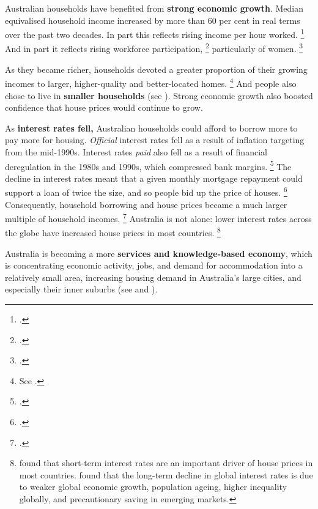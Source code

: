 Australian households have benefited from \textbf{strong economic growth}.
Median equivalised household income increased by more than 60 per cent in real terms over the past two decades.
In part this reflects rising income per hour worked.%
\footcites{AusProdTrends17}{EslakeWalsh-2011-Aust-Prod-challenge}
And in part it reflects rising workforce participation,%
    \footcites{YatesExplainer2015}{AGoodHouse2008}
particularly of women.%
	\footcite{Borland-June-2017-snapshot}

As they became richer, households devoted a greater proportion of their growing incomes to larger, higher-quality and better-located homes.%
	\footnote{See .}
And people also chose to live in \textbf{smaller households} (see ).
Strong economic growth also boosted confidence that house prices would continue to grow.

As \textbf{interest rates fell,} Australian households could afford to borrow more to pay more for housing. \emph{Official} interest rates fell as a result of inflation targeting from the mid-1990s.
Interest rates \emph{paid} also fell as a result of financial deregulation in the 1980s and 1990s, which compressed bank margins.%
	\footcites{Lowe2017Householddebt}{2010BirdsEyeView}
The decline in interest rates meant that a given monthly mortgage repayment could support a loan of twice the size, and so people bid up the price of houses.%
	\footcites{KellyHarrisonHunterEtAl2013}{Ellis2013-Housing-Mortgage-Markets-speech}{InterestRatesandHosuePrices}{KohlerandvanderMerwe}{OttoGrowthofHousePrices}
Consequently, household borrowing and house prices became a much larger multiple of household incomes.%
	\footcites{KellyHarrisonHunterEtAl2013}{KohlerandvanderMerwe}
Australia is not alone: lower interest rates across the globe have increased house prices in most countries.%
	\footnote{\textcite{InterestRatesandHosuePrices} found that short-term interest rates are an important driver of house prices in most countries. \textcite{SecularDrivers2015} found that the long-term decline in global interest rates is due to weaker global economic growth, population ageing, higher inequality globally, and precautionary saving in emerging markets.}

Australia is becoming a more \textbf{services and knowledge-based economy}, which is concentrating economic activity, jobs, and demand for accommodation into a relatively small area, increasing housing demand in Australia's large cities, and especially their inner suburbs (see  and ).

